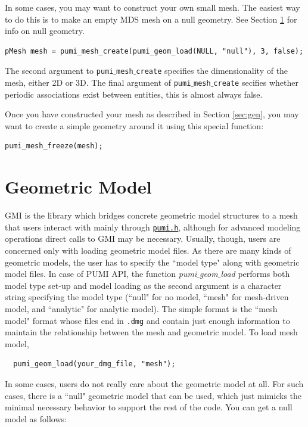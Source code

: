 \documentclass{article}
\begin{document}
In some cases, you may want to construct your own small mesh.
The easiest way to do this is to make an empty MDS mesh
on a null geometry.
See Section \ref{sec:gmi} for info on null geometry.

\begin{lstlisting}
pMesh mesh = pumi_mesh_create(pumi_geom_load(NULL, "null"), 3, false);
\end{lstlisting}

The second argument to \texttt{pumi$\_$mesh$\_$create}
specifies the dimensionality of the mesh, either 2D or 3D.
The final argument of \texttt{pumi$\_$mesh$\_$create} secifies whether periodic associations
exist between entities, this is almost always false.

Once you have constructed your mesh as described in Section \ref{sec:gen},
you may want to create a simple geometry around it using
this special function:

\begin{lstlisting}
pumi_mesh_freeze(mesh);
\end{lstlisting}

\section{Geometric Model}
\label{sec:gmi}

GMI is the library which bridges concrete geometric model structures
to a mesh that users interact with mainly through \href{https://github.com/SCOREC/core/blob/master/pumi/pumi.h}{\texttt{pumi.h}}, although
for advanced modeling operations direct calls to GMI may be necessary.
Usually, though, users are concerned only with loading geometric model
files.
As there are many kinds of geometric models, the user has to specify the ``model type" along with geometric model files. In case of PUMI API, the function \emph{pumi$\_$geom$\_$load} performs both model type set-up and model loading as the second argument is a character string specifying the model type (``null" for no model, ``mesh" for mesh-driven model, and ``analytic" for analytic model). The simple format is the ``mesh model" format whose files end in
\texttt{.dmg} and contain just enough information to maintain
the relationship between the mesh and geometric model.
To load mesh model, 

\begin{lstlisting}
  pumi_geom_load(your_dmg_file, "mesh");
\end{lstlisting}

In some cases, users do not really care about the geometric model at
all.
For such cases, there is a ``null" geometric model that can be used,
which just mimicks the minimal necessary behavior to support
the rest of the code.
You can get a null model as follows:
\end{document}
